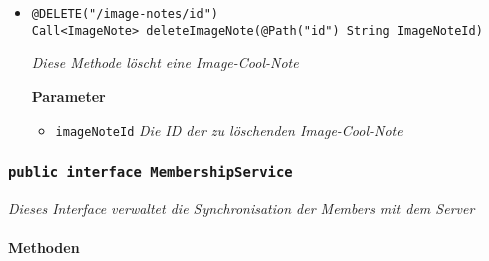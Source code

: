 \begin{itemize}
	     \item\texttt{{@DELETE("/image-notes/{id}")\\Call<ImageNote> deleteImageNote(@Path("\grqq id\grqq") String ImageNoteId)}}

		\textit{Diese Methode löscht eine Image-Cool-Note}

		\textbf{Parameter} 
			\begin{itemize}
				\item\texttt{imageNoteId}
		 		\textit{Die ID der zu löschenden Image-Cool-Note }
	 		\end{itemize}

	 \end{itemize}


	\subsubsection{\texttt{public interface MembershipService }}
\textit{Dieses Interface verwaltet die Synchronisation der Members mit dem Server}\\
\\
	\textbf{Methoden} 
